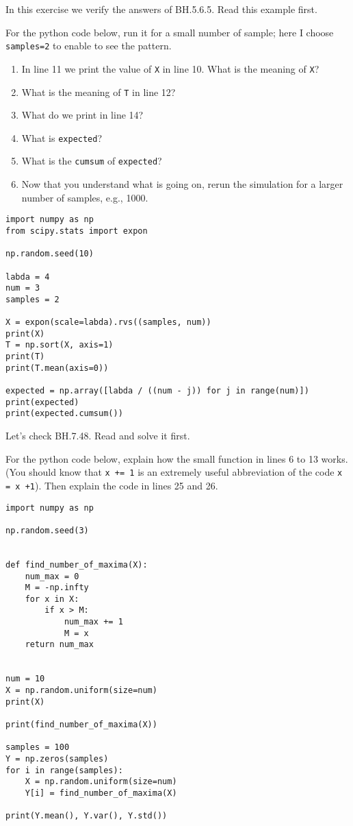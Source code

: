 \documentclass[assignments]{subfiles}
\begin{document}
\begin{exercise}
In this exercise we verify the answers of BH.5.6.5. Read this example first.   

For the python  code below, run it for a small number of sample;  here I choose  \texttt{samples=2} to enable to see the pattern. 
\begin{enumerate}
\item In line 11 we print the value of \texttt{X} in line 10. What is the meaning of \texttt{X}?
\item What is the meaning of \texttt{T} in line 12? 
\item What do we print in line 14? 
\item What is \texttt{expected}? 
\item What is the \texttt{cumsum} of \texttt{expected}? 
\item Now that you understand what is going on, rerun the simulation for a larger number of samples, e.g., 1000.
\end{enumerate}


\begin{verbatim}
import numpy as np
from scipy.stats import expon

np.random.seed(10)

labda = 4
num = 3
samples = 2

X = expon(scale=labda).rvs((samples, num))
print(X)
T = np.sort(X, axis=1)
print(T)
print(T.mean(axis=0))

expected = np.array([labda / ((num - j)) for j in range(num)])
print(expected)
print(expected.cumsum())
\end{verbatim}
\end{exercise}


\begin{exercise}
Let's check  BH.7.48. Read and solve it first.  

For  the python code below, explain how the small function in lines 6 to 13 works. (You should know that \texttt{x += 1} is an extremely useful abbreviation of the code \texttt{x = x +1}). Then explain the code in lines 25 and 26.

\begin{verbatim}
import numpy as np

np.random.seed(3)


def find_number_of_maxima(X):
    num_max = 0
    M = -np.infty
    for x in X:
        if x > M:
            num_max += 1
            M = x
    return num_max


num = 10
X = np.random.uniform(size=num)
print(X)

print(find_number_of_maxima(X))

samples = 100
Y = np.zeros(samples)
for i in range(samples):
    X = np.random.uniform(size=num)
    Y[i] = find_number_of_maxima(X)

print(Y.mean(), Y.var(), Y.std())
\end{verbatim}
\end{exercise}
\end{document}

